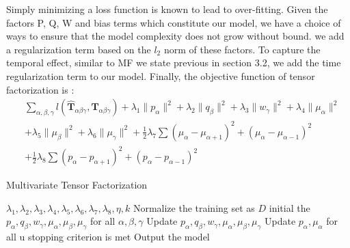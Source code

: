 Simply minimizing a loss function is known to lead to over-fitting.
Given the factors P, Q, W and bias terms which constitute our model, we have a choice of ways to ensure that the model complexity does not grow without bound.
we add a regularization term based on the $l_2$ norm of these
factors.
To capture the temporal effect, similar to MF we state previous in section 3.2, we add the time regularization term to our model.
Finally, the objective function of tensor factorization is :\\
\begin{equation*}
\begin{aligned}
&\sum\limits_{\alpha, \beta, \gamma} l( \hat{\mathbf{T}}_{\alpha\beta\gamma}, \mathbf{T}_{\alpha\beta \gamma} )+\lambda_1\|p_{\alpha}\|^2+\lambda_2\|q_\beta\|^2+\lambda_3\|w_\gamma\|^2+\lambda_4\|
\mu_\alpha\|^2\\
&+\lambda_5\|\mu_\beta\|^2+\lambda_6\|\mu_\gamma\|^2+\frac{1}{2}\lambda_7\sum(\mu_\alpha-\mu_{\alpha+1})^2+(\mu_\alpha-\mu_{\alpha-1})^2
\\&
+\frac{1}{2}\lambda_8\sum(p_\alpha-p_{\alpha+1})^2+(p_\alpha-p_{\alpha-1})^2
\end{aligned}
\end{equation*}

\begin{algorithm}[h]
  \caption{Multivariate Tensor Factorization}
  \label{alg::conjugateGradient}
  \begin{algorithmic}[1]
    \Require
    $\lambda_1,\lambda_2, \lambda_3, \lambda_4, \lambda_5, \lambda_6, \lambda_7, \lambda_8, \eta, k$
    \State Normalize the training set as $D$
    \State initial the $p_\alpha, q_\beta, w_\gamma, \mu_\alpha, \mu_\beta, \mu_\gamma$ for all $\alpha, \beta, \gamma$
    \Repeat
      \State Update $p_\alpha, q_\beta, w_\gamma, \mu_\alpha, \mu_\beta, \mu_\gamma$ 
     \EndFor
     \State Update $p_\alpha,  \mu_\alpha $ for all u
    \Until stopping criterion is met
    \State Output the model 
  \end{algorithmic}
\end{algorithm}

